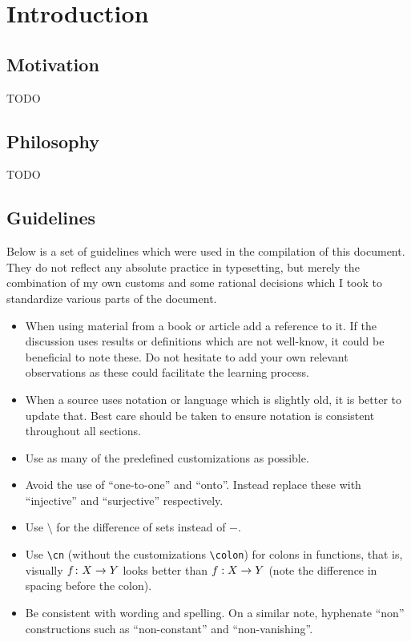 \chapter{Introduction}

\section{Motivation}

TODO

\section{Philosophy}

TODO

\section{Guidelines}

Below is a set of guidelines which were used in the compilation of this document. They do not reflect any absolute practice in typesetting, but merely the combination of my own customs and some rational decisions which I took to standardize various parts of the document.
\begin{itemize}
\item
  When using material from a book or article add a reference to it. If the discussion uses results or definitions which are not well-know, it could be beneficial to note these. Do not hesitate to add your own relevant observations as these could facilitate the learning process.
\item
  When a source uses notation or language which is slightly old, it is better to update that. Best care should be taken to ensure notation is consistent throughout all sections.
\item
  Use as many of the predefined customizations as possible.
\item
  Avoid the use of ``one-to-one'' and ``onto''. Instead replace these with ``injective'' and ``surjective'' respectively.
\item Use $\setminus$ for the difference of sets instead of $-$.
\item Use \texttt{\textbackslash cn} (without the customizations \texttt{\textbackslash colon}) for colons in functions, that is, visually $f \cn X \rarr Y$ looks better than $f : X \rarr Y$ (note the difference in spacing before the colon).
\item Be consistent with wording and spelling. On a similar note, hyphenate ``non'' constructions such as ``non-constant'' and ``non-vanishing''.
\end{itemize}


